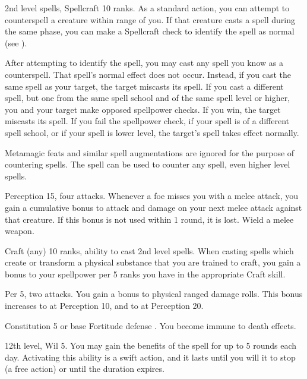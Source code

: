\featpres 2nd level spells, Spellcraft 10 ranks.
\featben As a standard action, you can attempt to counterspell a creature within \rngmed range of you.
If that creature casts a spell during the same phase, you can make a Spellcraft check to identify the spell as normal (see ).

After attempting to identify the spell, you may cast any spell you know as a counterspell.
That spell's normal effect does not occur.
Instead, if you cast the same spell as your target, the target miscasts its spell.
If you cast a different spell, but one from the same spell school and of the same spell level or higher, you and your target make opposed spellpower checks.
If you win, the target miscasts its spell.
If you fail the spellpower check, if your spell is of a different spell school, or if your spell is lower level, the target's spell takes effect normally.

Metamagic feats and similar spell augmentations are ignored for the purpose of countering spells.
The 
spell can be used to counter any spell, even higher level spells.

\featpres Perception 15, four attacks.
\featben Whenever a foe misses you with a melee attack, you gain a cumulative  bonus to attack and damage on your next melee attack against that creature.
If this bonus is not used within 1 round, it is lost.
\stylereq Wield a melee weapon.

\featpres Craft (any) 10 ranks, ability to cast 2nd level spells.
\featben When casting spells which create or transform a physical substance that you are trained to craft, you gain a  bonus to your spellpower per 5 ranks you have in the appropriate Craft skill.

\featpres Per 5, two attacks.
\featben You gain a  bonus to physical ranged damage rolls.
This bonus increases to  at Perception 10, and to  at Perception 20.

\featpre Constitution 5 or base Fortitude defense .
\featben You become immune to death effects.

\featpres 12th level, Wil 5.
\featben You may gain the benefits of the 
spell for up to 5 rounds each day.
Activating this ability is a swift action, and it lasts until you will it to stop (a free action) or until the duration expires.

